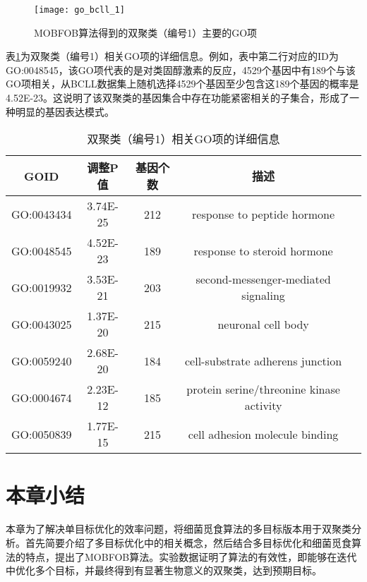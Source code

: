     \begin{figure}[htbp]
        \centering
        \texttt{[image: go\_bcll\_1]}
        \caption{MOBFOB算法得到的双聚类（编号1）主要的GO项}
        \label{fig:go_bcll}
    \end{figure}
    表\ref{tab:go_term}为双聚类（编号1）相关GO项的详细信息。例如，表中第二行对应的ID为GO:0048545，该GO项代表的是对类固醇激素的反应，4529个基因中有189个与该GO项相关，从BCLL数据集上随机选择4529个基因至少包含这189个基因的概率是4.52E-23。这说明了该双聚类的基因集合中存在功能紧密相关的子集合，形成了一种明显的基因表达模式。

    \begin{table}[htbp]
        \caption{双聚类（编号1）相关GO项的详细信息}\label{tab:go_term}
        \vspace{0.5em}\centering\wuhao
        \begin{tabular}{ccccc}
        \toprule[1.5pt]
        GOID & 调整P值 &  基因个数 & 描述\\
        \midrule[1pt]
        GO:0043434  &3.74E-25& 212& response to peptide hormone \\
        GO:0048545  &4.52E-23& 189& response to steroid hormone \\
        GO:0019932  &3.53E-21& 203& second-messenger-mediated signaling \\
        GO:0043025  &1.37E-20& 215& neuronal cell body \\
        GO:0059240  &2.68E-20& 184& cell-substrate adherens junction \\
        GO:0004674  &2.23E-12& 185& protein serine/threonine kinase activity \\
        GO:0050839  &1.77E-15& 215& cell adhesion molecule binding \\
        \bottomrule[1.5pt]
        \end{tabular}
    \end{table}

\section{本章小结}
本章为了解决单目标优化的效率问题，将细菌觅食算法的多目标版本用于双聚类分析。首先简要介绍了多目标优化中的相关概念，然后结合多目标优化和细菌觅食算法的特点，提出了MOBFOB算法。实验数据证明了算法的有效性，即能够在迭代中优化多个目标，并最终得到有显著生物意义的双聚类，达到预期目标。